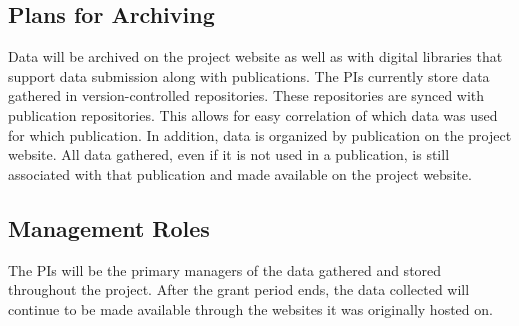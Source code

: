\subsection*{Plans for Archiving} 
Data will be archived on the project website as well as with digital libraries that support data submission along with publications.
The PIs currently store data gathered in version-controlled repositories.
These repositories are synced with publication repositories.
This allows for easy correlation of which data was used for which publication.
In addition, data is organized by publication on the project website.
All data gathered, even if it is not used in a publication, is still associated with that publication and made available on the project website.  

\subsection*{Management Roles}
The PIs will be the primary managers of the data gathered and stored throughout the project.
After the grant period ends, the data collected will continue to be made available through the websites it was originally hosted on. 



